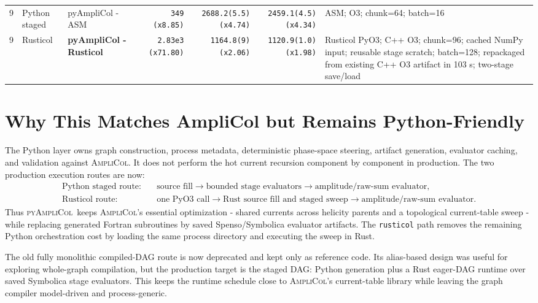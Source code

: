 \documentclass[10pt]{article}
\newcommand{\AC}{\textsc{AmpliCol}}
\newcommand{\PAC}{\textsc{pyAmpliCol}}
\begin{document}
\begin{landscape}
\begin{center}
\begin{tabular}{@{}r L{0.92in} L{1.52in} r r r L{3.18in}@{}}
9 & Python staged & pyAmpliCol - ASM & \texttt{349} \textcolor{speedred}{\texttt{(x8.85)}} & \texttt{2688.2(5.5)} \textcolor{speedred}{\texttt{(x4.74)}} & \texttt{2459.1(4.5)} \textcolor{speedred}{\texttt{(x4.34)}} & ASM; O3; chunk=64; batch=16 \\
 9 & Rusticol & \textbf{pyAmpliCol - Rusticol} & \texttt{2.83e3} \textcolor{speedred}{\texttt{(x71.80)}} & \texttt{1164.8(9)} \textcolor{speedred}{\texttt{(x2.06)}} & \texttt{1120.9(1.0)} \textcolor{speedorange}{\texttt{(x1.98)}} & Rusticol PyO3; C++ O3; chunk=96; cached NumPy input; reusable stage scratch; batch=128; repackaged from existing C++ O3 artifact in 103 s; two-stage save/load \\
\bottomrule
\end{tabular}
\end{center}

\end{landscape}



\section{Why This Matches AmpliCol but Remains Python-Friendly}

The Python layer owns graph construction, process metadata, deterministic
phase-space steering, artifact generation, evaluator caching, and validation
against \AC.  It does not perform the hot current recursion component by
component in production.  The two production execution routes are now:
\begin{align*}
  \text{Python staged route:}&\quad
  \text{source fill} \to \text{bounded stage evaluators} \to
  \text{amplitude/raw-sum evaluator},\\
  \text{Rusticol route:}&\quad
  \text{one PyO3 call} \to \text{Rust source fill and staged sweep} \to
  \text{amplitude/raw-sum evaluator}.
\end{align*}
Thus \PAC\ keeps \AC's essential optimization - shared currents across helicity
parents and a topological current-table sweep - while replacing generated
Fortran subroutines by saved Spenso/Symbolica evaluator artifacts.  The
\texttt{rusticol} path removes the remaining Python orchestration cost by
loading the same process directory and executing the sweep in Rust.

The old fully monolithic compiled-DAG route is now deprecated and kept only as
reference code.  Its alias-based design was useful for exploring whole-graph
compilation, but the production target is the staged DAG: Python generation plus
a Rust eager-DAG runtime over saved Symbolica stage evaluators.  This keeps the
runtime schedule close to \AC's current-table library while leaving the graph
compiler model-driven and process-generic.
\end{document}
